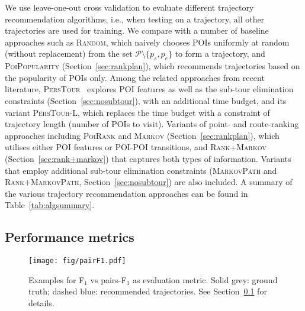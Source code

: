 We use leave-one-out cross validation to evaluate different trajectory recommendation algorithms,
i.e., when testing on a trajectory, all other trajectories are used for training.
We compare with a number of baseline approaches such as \textsc{Random},
which naively chooses POIs uniformly at random (without replacement) from the set $\mathcal{P} \setminus \{p_s, p_e \}$ to form a trajectory,
and \textsc{PoiPopularity} (Section~\ref{sec:rankplan}), which recommends trajectories based on the popularity of POIs only.
Among the related approaches from recent literature,
\textsc{PersTour}~\cite{ijcai15} explores POI features as well as the sub-tour elimination constraints (Section~\ref{sec:nosubtour}),
with an additional time budget, and its variant \textsc{PersTour-L},
which replaces the time budget with a constraint of trajectory length (number of POIs to visit).
Variants of point- and route-ranking approaches including \textsc{PoiRank} and \textsc{Markov} (Section~\ref{sec:rankplan}),
which utilises either POI features or POI-POI transitions,
and \textsc{Rank+Markov} (Section~\ref{sec:rank+markov}) that captures both types of information. %
Variants that employ additional sub-tour elimination constraints
(\textsc{MarkovPath} and \textsc{Rank+MarkovPath}, Section~\ref{sec:nosubtour}) are also included.
A summary of the various trajectory recommendation approaches can be found in Table~\ref{tab:algsummary}.






\subsection{Performance metrics}
\label{sec:metric}

\begin{figure}[t]
	\centering
	\texttt{[image: fig/pairF1.pdf]}
	\caption{Examples for F$_1$ vs pairs-F$_1$ as evaluation metric.
Solid grey: ground truth; dashed blue: recommended trajectories. See Section~\ref{sec:metric} for details.}
	\label{fig:pairf1}\captionmoveup
\end{figure}

